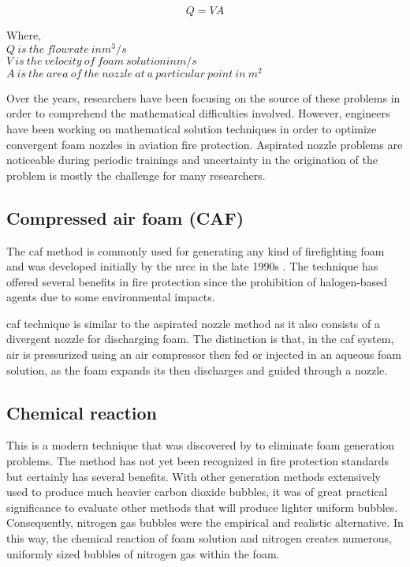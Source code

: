 \begin{equation}
    Q = VA
\end{equation}


\begin{doublespace}
    Where, \\
    $Q\ is\ the\ flowrate\ in m^3/s$ \\
    $V\ is\ the\ velocity\ of\ foam\ solution in m/s$ \\
    $A\ is\ the\ area\ of\ the\ nozzle\ at\ a\ particular\ point\ in\ m^2$ \\
\end{doublespace}

Over the years, researchers have been focusing on the source of these problems in order to comprehend the mathematical difficulties involved. However, engineers have been working on mathematical solution techniques in order to optimize convergent foam nozzles in aviation fire protection. Aspirated nozzle problems are noticeable during periodic trainings and uncertainty in the origination of the problem is mostly the challenge for many researchers.

\subsection{Compressed air foam (CAF)}
The \acrshort{caf} method is commonly used for generating any kind of firefighting foam and was developed initially by the \Acrfull{nrcc} in the late 1990s \cite{rie2016class}. The technique has offered several benefits in fire protection since the prohibition of halogen-based agents due to some environmental impacts.  

\acrshort{caf} technique is similar to the aspirated nozzle method as it also consists of a divergent nozzle for discharging foam. The distinction is that, in the \acrshort{caf} system, air is pressurized using an air compressor then fed or injected in an aqueous foam solution, as the foam expands its then discharges and guided through a nozzle.

\subsection{Chemical reaction}
This is a modern technique that was discovered by \cite{laundess2012suppression} to eliminate foam generation problems. The method has not yet been recognized in fire protection standards but certainly has several benefits. With other generation methods extensively used to produce much heavier carbon dioxide bubbles, it was of great practical significance to evaluate other methods that will produce lighter uniform bubbles. Consequently, nitrogen gas bubbles were the empirical and realistic alternative. In this way, the chemical reaction of foam solution and nitrogen creates numerous, uniformly sized bubbles of nitrogen gas within the foam.

